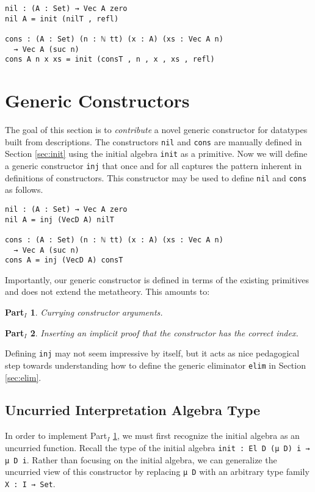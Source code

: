 \documentclass[preprint,nonatbib]{sigplanconf}
\newtheorem{myparti}{Part$_I$}
\newcommand{\refsec}[1]{Section \ref{sec:#1}}
\newcommand{\refparti}[1]{Part$_I$ \ref{parti:#1}}
\begin{document}
\begin{verbatim}
nil : (A : Set) → Vec A zero
nil A = init (nilT , refl)

cons : (A : Set) (n : ℕ tt) (x : A) (xs : Vec A n)
  → Vec A (suc n)
cons A n x xs = init (consT , n , x , xs , refl)
\end{verbatim}

\section{Generic Constructors}
\label{sec:inj}

The goal of this section is to {\it contribute} a novel generic
constructor for datatypes built from descriptions.
The constructors {\tt nil} and {\tt cons} are manually
defined in \refsec{init} using the initial algebra
{\tt init} as a primitive. Now we will define a generic constructor
{\tt inj} that once and for all captures the pattern inherent in
definitions of constructors.  This constructor
may be used to define {\tt nil} and {\tt cons} as follows.

\begin{verbatim}
nil : (A : Set) → Vec A zero
nil A = inj (VecD A) nilT

cons : (A : Set) (n : ℕ tt) (x : A) (xs : Vec A n)
  → Vec A (suc n)
cons A = inj (VecD A) consT
\end{verbatim}

Importantly, our generic constructor is
defined in terms of the existing primitives and does not extend the
metatheory.
This amounts to:

\begin{myparti}
\label{parti:one}
Currying constructor arguments.
\end{myparti}

\begin{myparti}
\label{parti:two}
Inserting an implicit proof that the constructor has the correct index.
\end{myparti}

Defining {\tt inj} may not seem impressive by itself, but it acts as
nice pedagogical step towards understanding how to define the generic
eliminator {\tt elim} in \refsec{elim}.

\subsection{Uncurried Interpretation Algebra Type}

In order to implement \refparti{one}, we must first recognize the
initial algebra as an uncurried function. Recall the type of the
initial algebra {\tt init : El D (μ D) i → μ D i}. Rather than
focusing on the initial algebra, we can generalize the uncurried view
of this constructor by replacing {\tt μ D} with an arbitrary
type family {\tt X : I → Set}.
\end{document}
